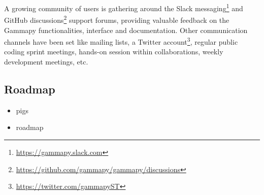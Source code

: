 A growing community of users is gathering around the Slack messaging\footnote{\url{https://gammapy.slack.com}} and GitHub discussions\footnote{\url{https://github.com/gammapy/gammapy/discussions}} support forums, providing valuable feedback on the Gammapy functionalities, interface and documentation. Other communication channels have been set like mailing lists, a Twitter account\footnote{\url{https://twitter.com/gammapyST}}, regular public coding sprint meetings, hands-on session within collaborations, weekly development meetings, etc.

\subsection{Roadmap}

\begin{itemize}
	\item pigs
	\item roadmap
\end{itemize}
